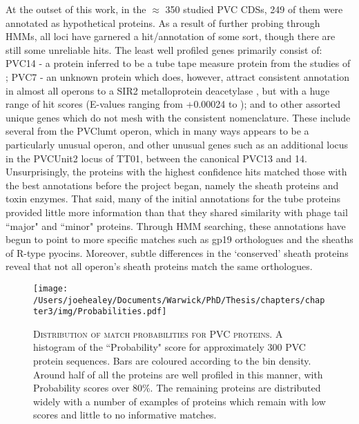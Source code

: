 At the outset of this work, in the $\approx$ 350 studied PVC CDSs, 249 of them were annotated as hypothetical proteins. As a result of further probing through HMMs, all loci have garnered a hit/annotation of some sort, though there are still some unreliable hits. The least well profiled genes primarily consist of: PVC14 - a protein inferred to be a tube tape measure protein from the studies of \cite{Rybakova2013}; PVC7 - an unknown protein which does, however, attract consistent annotation in almost all operons to a SIR2 metalloprotein deacetylase \citep{Shore2000}, but with a huge range of hit scores (E-values ranging from +0.00024 to ); and to other assorted unique genes which do not mesh with the consistent nomenclature. These include several from the PVClumt operon, which in many ways appears to be a particularly unusual operon, and other unusual genes such as an additional locus in the PVCUnit2 locus of \Plum{} TT01, between the canonical PVC13 and 14. Unsurprisingly, the proteins with the highest confidence hits matched those with the best annotations before the project began, namely the sheath proteins and toxin enzymes. That said, many of the initial annotations for the tube proteins provided little more information than that they shared similarity with phage tail ``major" and ``minor" proteins. Through HMM searching, these annotations have begun to point to more specific matches such as gp19 orthologues and the sheaths of R-type pyocins. Moreover, subtle differences in the `conserved' sheath proteins reveal that not all operon's sheath proteins match the same orthologues.


\begin{figure}[h]
\centering
\texttt{[image: /Users/joehealey/Documents/Warwick/PhD/Thesis/chapters/chapter3/img/Probabilities.pdf]}
	\captionsetup{singlelinecheck=off, justification=justified, font=footnotesize, aboveskip=10pt}
	\caption[HHPred orthologue match scores]{\textsc{\normalsize Distribution of match probabilities for PVC proteins.}\vspace{0.1cm} \newline A histogram of the ``Probability" score for approximately 300 PVC protein sequences. Bars are coloured according to the bin density. Around half of all the proteins are well profiled in this manner, with Probability scores over 80\%. The remaining proteins are distributed widely with a number of examples of proteins which remain with low scores and little to no informative matches.}
	\label{probhist}
\end{figure}


